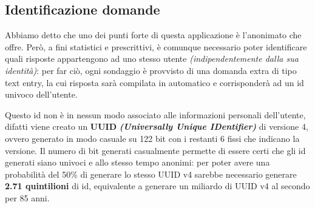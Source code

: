 \subsection{Identificazione domande}
Abbiamo detto che uno dei punti forte di questa applicazione è l'anonimato che offre. Però, a fini statistici e prescrittivi, è comunque necessario poter identificare quali risposte appartengono ad uno stesso utente \textit{(indipendentemente dalla sua identità)}: per far ciò, ogni sondaggio è provvisto di una domanda extra di tipo text entry, la cui risposta sarà compilata in automatico e corrisponderà ad un id univoco dell'utente.

Questo id non è in nessun modo associato alle informazioni personali dell'utente, difatti viene creato un \textbf{UUID} \textbf{\textit{(Universally Unique IDentifier)}} di versione 4, ovvero generato in modo casuale su 122 bit con i restanti 6 fissi che indicano la versione. Il numero di bit generati casualmente permette di essere certi che gli id generati siano univoci e allo stesso tempo anonimi: per poter avere una probabilità del 50\% di generare lo stesso UUID v4 sarebbe necessario generare \textbf{2.71 quintilioni} di id, equivalente a generare un miliardo di UUID v4 al secondo per 85 anni\cite{UUID}.